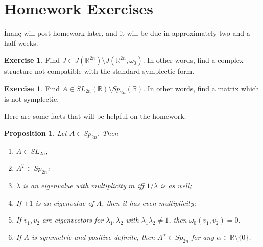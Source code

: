 \documentclass[leqno, openany]{memoir}
\newtheorem{prop}[thm]{Proposition}
\theoremstyle{definition}
\newtheorem{exer}[thm]{Exercise}
\theoremstyle{remark}
\theoremstyle{plain}
\theoremstyle{definition}
\theoremstyle{remark}
\newcommand{\R}{\mathbb{R}}
\begin{document}
\section{Homework Exercises}%
\label{sec:homework_exercises}

\.Inan\c{c} will post homework later, and it will be due in approximately two and a half weeks.

\begin{exer}
    Find $J \in J(\R^{2n}) \setminus J(\R^{2n}, \omega_0)$. In other words, find a complex structure not compatible with the standard symplectic form.
\end{exer}

\begin{exer}
    Find $A \in SL_{2n}(\R) \setminus Sp_{2n}(\R)$. In other words, find a matrix which is not symplectic.
\end{exer}

Here are some facts that will be helpful on the homework.

\begin{prop}
    Let $A \in Sp_{2n}$. Then
    \begin{enumerate}
        \item $A \in SL_{2n}$;
        \item $A^T \in Sp_{2n}$;
        \item $\lambda$ is an eigenvalue with multiplicity $m$ iff $1/\lambda$ is as well;
        \item If $\pm 1$ is an eigenvalue of $A$, then it has even multiplicity;
        \item If $v_1, v_2$ are eigenvectors for $\lambda_1, \lambda_2$ with $\lambda_1\lambda_2 \neq 1$, then $\omega_0(v_1, v_2) = 0$.
        \item If $A$ is symmetric and positive-definite, then $A^{\alpha} \in Sp_{2n}$ for any $\alpha \in \R \setminus \{0\}$.
    \end{enumerate}
\end{prop}
\end{document}
